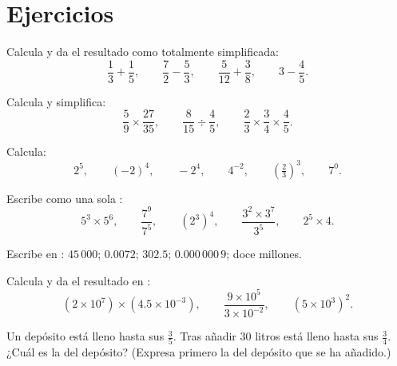 \section{Ejercicios}

\begin{exercise}[$\star$]\label{exo:g9:fractions:1}
Calcula y da el resultado como  totalmente simplificada:
\[
\frac13 + \frac15, \qquad
\frac72 - \frac53, \qquad
\frac{5}{12} + \frac38, \qquad
3 - \frac45 .
\]
\end{exercise}

\begin{exercise}[$\star$]\label{exo:g9:fractions:2}
Calcula y simplifica:
\[
\frac59 \times \frac{27}{35}, \qquad
\frac{8}{15} \div \frac{4}{5}, \qquad
\frac23 \times \frac34 \times \frac45 .
\]
\end{exercise}

\begin{exercise}[$\star$]\label{exo:g9:fractions:3}
Calcula:
\[
2^5, \qquad (-2)^4, \qquad -2^4, \qquad 4^{-2}, \qquad
\left(\tfrac23\right)^3, \qquad 7^0 .
\]
\end{exercise}

\begin{exercise}[$\star$]\label{exo:g9:fractions:4}
Escribe como una sola :
\[
5^3 \times 5^6, \qquad
\frac{7^9}{7^5}, \qquad
\left(2^3\right)^4, \qquad
\frac{3^2 \times 3^7}{3^5}, \qquad
2^5 \times 4 .
\]
\end{exercise}

\begin{exercise}[$\star$]\label{exo:g9:fractions:5}
Escribe en : $45\,000$; $0.0072$; $302.5$;
$0.000\,000\,9$; doce millones.
\end{exercise}

\begin{exercise}[$\star\star$]\label{exo:g9:fractions:6}
Calcula y da el resultado en :
\[
(2 \times 10^7) \times (4.5 \times 10^{-3}),
\qquad
\frac{9 \times 10^5}{3 \times 10^{-2}},
\qquad
(5 \times 10^3)^2 .
\]
\end{exercise}

\begin{exercise}[$\star\star$]\label{exo:g9:fractions:7}
Un depósito está lleno hasta sus $\frac35$. Tras añadir $30$ litros está lleno hasta sus $\frac34$.
¿Cuál es la  del depósito? (Expresa primero la  del depósito
que se ha añadido.)
\end{exercise}

